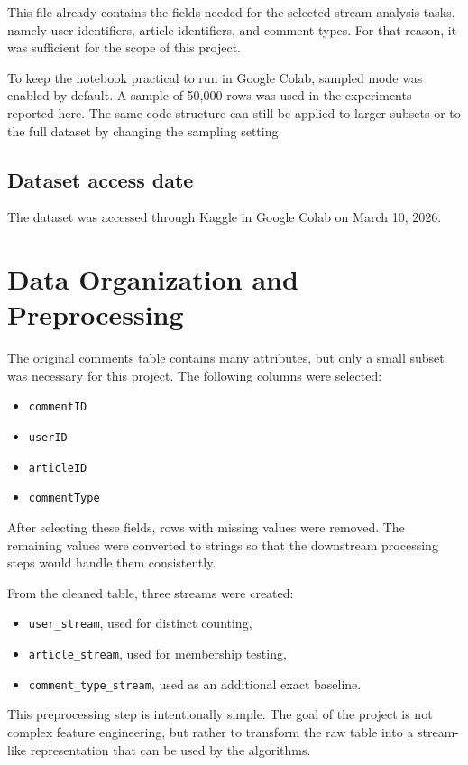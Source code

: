 \documentclass[11pt,a4paper]{article}
\begin{document}
This file already contains the fields needed for the selected stream-analysis tasks, namely user identifiers, article identifiers, and comment types. For that reason, it was sufficient for the scope of this project.

To keep the notebook practical to run in Google Colab, sampled mode was enabled by default. A sample of 50{,}000 rows was used in the experiments reported here. The same code structure can still be applied to larger subsets or to the full dataset by changing the sampling setting.

\subsection*{Dataset access date}
The dataset was accessed through Kaggle in Google Colab on March 10, 2026.

\section{Data Organization and Preprocessing}

The original comments table contains many attributes, but only a small subset was necessary for this project. The following columns were selected:
\begin{itemize}
    \item \texttt{commentID}
    \item \texttt{userID}
    \item \texttt{articleID}
    \item \texttt{commentType}
\end{itemize}

After selecting these fields, rows with missing values were removed. The remaining values were converted to strings so that the downstream processing steps would handle them consistently.

From the cleaned table, three streams were created:
\begin{itemize}
    \item \texttt{user\_stream}, used for distinct counting,
    \item \texttt{article\_stream}, used for membership testing,
    \item \texttt{comment\_type\_stream}, used as an additional exact baseline.
\end{itemize}

This preprocessing step is intentionally simple. The goal of the project is not complex feature engineering, but rather to transform the raw table into a stream-like representation that can be used by the algorithms.
\end{document}
